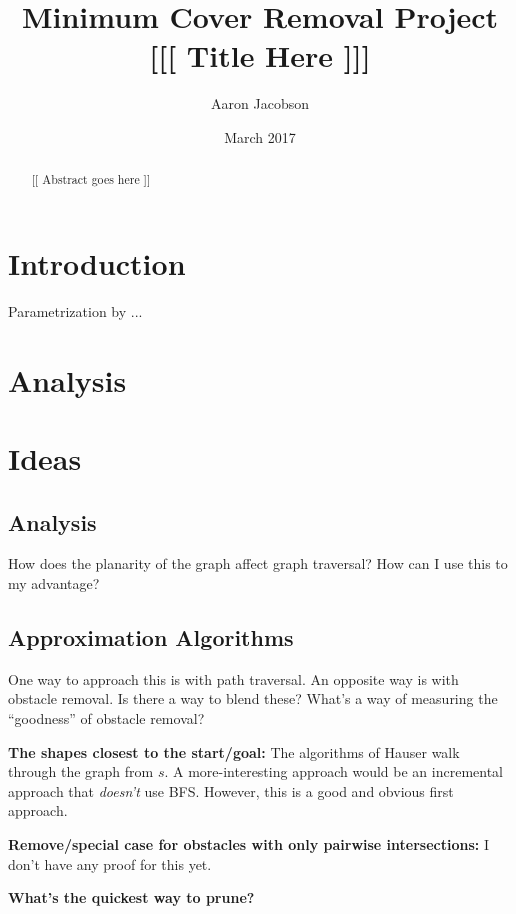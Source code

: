 \documentclass{amsart}
\begin{document}
{\Large

\title{Minimum Cover Removal Project [[[ Title Here ]]]}
\author{Aaron Jacobson}
\date{March 2017}
\maketitle

\begin{abstract}
[[ Abstract goes here ]]
\end{abstract}

\section{Introduction}

Parametrization by ...

\section{Analysis}

\section{Ideas}

\subsection{Analysis}

How does the planarity of the graph affect graph traversal? How can I use this to my advantage?

\subsection{Approximation Algorithms}

One way to approach this is with path traversal. An opposite way is with obstacle removal. Is there a way to blend these? What's a way of measuring the ``goodness'' of obstacle removal?

\textbf{The shapes closest to the start/goal:} The algorithms of Hauser walk through the graph from $s$. A more-interesting approach would be an incremental approach that \emph{doesn't} use BFS. However, this is a good and obvious first approach.

\textbf{Remove/special case for obstacles with only pairwise intersections:} I don't have any proof for this yet.

\textbf{What's the quickest way to prune?}

}
\end{document}
